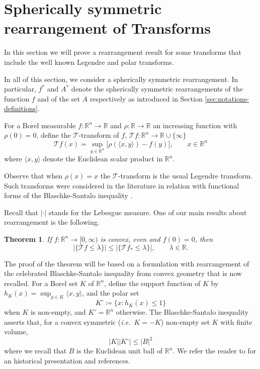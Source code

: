 \documentclass[11pt]{article}
\newtheorem{theorem}[conjecture]{Theorem}
\newcommand{\1}{[1]}
\begin{document}
\section{Spherically symmetric rearrangement of Transforms} \label{sec:transforms}

In this section we will prove a rearrangement result for some transforms that include the well known Legendre and polar transforms.

In all of this section, we consider a spherically symmetric rearrangement. In particular, $f^*$ and $A^*$ denote the spherically symmetric rearrangements of the function $f$ and of the set $A$ respectively as introduced in Section \ref{sec:notations-definitions}.



For a Borel measurable $f : \mathbb{R}^n \to \mathbb{R}$ and $\rho:\mathbb{R}\rightarrow\mathbb{R}$ an increasing function with $\rho(0)=0$, define the $\mathcal{T}$-transform of $f$,  $\mathcal{T}f:\mathbb{R}^n \to \mathbb{R} \cup\{\infty\}$
    \begin{equation*}%
        \mathcal{T}f(x) = \sup_{y \in \mathbb{R}^n} \bigg[ \rho(\langle x , y  \rangle) -  f(y) \bigg], \qquad x \in \mathbb{R}^n
    \end{equation*}
where $\langle x , y  \rangle$ denote the Euclidean scalar product in $\mathbb{R}^n$.

Observe that when $\rho(x)=x$ the $\mathcal{T}$-transform
is the usual Legendre transform. %
Such transforms were considered in the literature in relation with functional forms of the Blaschke-Santalo inequality \cite{ball86,fradelizi-meyer,lehec}. 


Recall that $|\cdot|$ stands for the Lebesgue measure.  
One of our main results about rearrangement is the following.
 
\begin{theorem} \label{thm: majorization rearrangement transform}
        If $f: \mathbb{R}^n \to [0,\infty)$ is convex, even and $f(0) = 0$, then
        \[
            | \{ \mathcal{T}f \leq \lambda \} | \leq  | \{ \mathcal{T}f_* \leq \lambda \} |,
            \qquad \lambda \in \mathbb{R}.
        \]
\end{theorem}

The proof of the theorem will be based on 
a formulation with rearrangement of the celebrated Blaschke-Santalo inequality from convex geometry that is now recalled. 
For a Borel set $K$ of $\mathbb{R}^n$, define the support function of $K$ by $h_K(x) = \sup_{y \in K} \langle x, y \rangle$, and the polar set
    \[
        K^\circ \coloneqq \{ x: h_K(x) \leq 1 \}
    \]
    when $K$ is non-empty, and $K^\circ = \mathbb{R}^n$ otherwise.
The Blaschke-Santalo inequality asserts that, for a convex symmetric (\textit{i.e.}\ $K=-K$) non-empty set $K$ with finite volume,
        \[
            |K||K^\circ| \leq |B|^2 
        \]
where we recall that $B$ is the Euclidean unit ball of $\mathbb{R}^n$.
We refer the reader to \cite{fradelizi-23} for an historical presentation and references.
\end{document}
